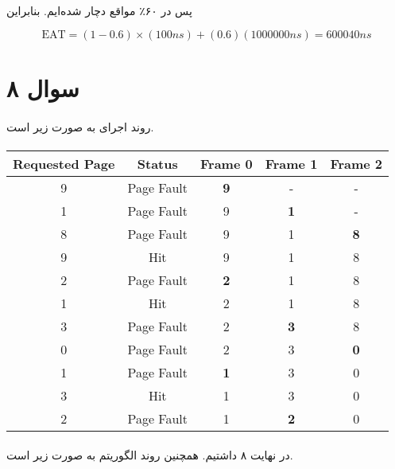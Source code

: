 \documentclass{article}
\begin{document}
	\paragraph*{}
	پس در
	۶۰٪
	مواقع دچار
	شده‌ایم. بنابراین

	\begin{equation*}
		\textrm{EAT} = (1-0.6)\times(100ns) + (0.6)(1000000ns) = 600040ns
	\end{equation*}

	\section*{سوال ۸}
	\paragraph*{}

	روند اجرای
	به صورت زیر است.

	\paragraph*{}
	\begin{latin}
		\centering
		\begin{tabular}{c|c|c|c|c}
			Requested Page & Status & Frame 0 & Frame 1 & Frame 2 \\
			\hline
			9 & Page Fault & \textbf{9} & - & - \\
			\hline
			1 & Page Fault & 9 & \textbf{1} & - \\
			\hline
			8 & Page Fault & 9 & 1 & \textbf{8} \\
			\hline
			9 & Hit & 9 & 1 & 8 \\
			\hline
			2 & Page Fault & \textbf{2} & 1 & 8 \\
			\hline
			1 & Hit & 2 & 1 & 8 \\
			\hline
			3 & Page Fault & 2 & \textbf{3} & 8 \\
			\hline
			0 & Page Fault & 2 & 3 & \textbf{0} \\
			\hline
			1 & Page Fault & \textbf{1} & 3 & 0 \\
			\hline
			3 & Hit & 1 & 3 & 0 \\
			\hline
			2 & Page Fault & 1 & \textbf{2} & 0 \\
		\end{tabular}
	\end{latin}

	\paragraph*{}
	در نهایت ۸
	داشتیم. همچنین روند الگوریتم
	به صورت زیر است.
\end{document}

